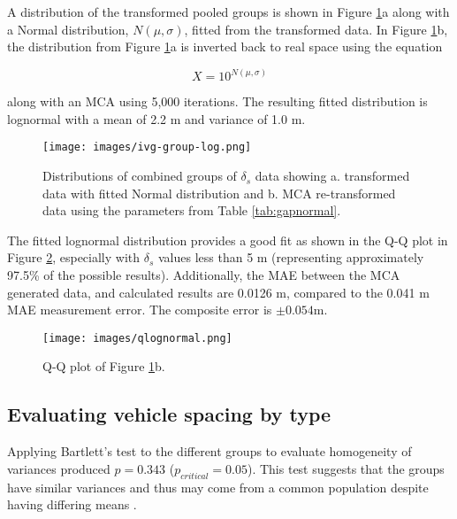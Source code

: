 \documentclass[preprint,12pt,a4paper]{elsarticle}
\begin{document}
\begin{linenumbers}
A distribution of the transformed pooled groups is shown in Figure \ref{fig:ivgloggroup}a along with a Normal distribution, $N(\mu,\sigma)$, fitted from the transformed data. In Figure \ref{fig:ivgloggroup}b, the distribution from Figure \ref{fig:ivgloggroup}a is inverted back to real space using the equation

\begin{equation}
\label{inverse-10}
X = 10^{N(\mu,\sigma)}
\end{equation}

along with an MCA using 5,000 iterations. The resulting fitted distribution is lognormal with a mean of 2.2 m and variance of 1.0 m. 
 
\begin{figure}[H]
\texttt{[image: images/ivg-group-log.png]} 
\caption[Distributions of combined groups of $\delta_{s}$ data.]{Distributions of combined groups of $\delta_{s}$ data showing a. transformed data with fitted Normal distribution and b. MCA re-transformed data using the parameters from Table \ref{tab:gapnormal}.}
\label{fig:ivgloggroup}
\end{figure}

The fitted lognormal distribution provides a good fit as shown in the Q-Q plot in Figure \ref{fig:qlognormal}, especially with  $\delta_{s}$ values less than 5 m (representing approximately 97.5\% of the possible results). Additionally, the MAE between the MCA generated data, and calculated results are 0.0126 m, compared to the 0.041 m MAE measurement error. The composite error is $\pm 0.054$m.

\begin{figure}[H]
\texttt{[image: images/qlognormal.png]} 
\caption{Q-Q plot of Figure \ref{fig:ivgloggroup}b.}
\label{fig:qlognormal}
\end{figure}

\subsection{Evaluating vehicle spacing by type}
Applying Bartlett's test to the different groups to evaluate homogeneity of variances produced $p = 0.343$ ($p_{critical} = 0.05$). This test suggests that the groups have similar variances and thus may come from a common population despite having differing means \citep{NIST2013}.


\end{linenumbers}
\end{document}
